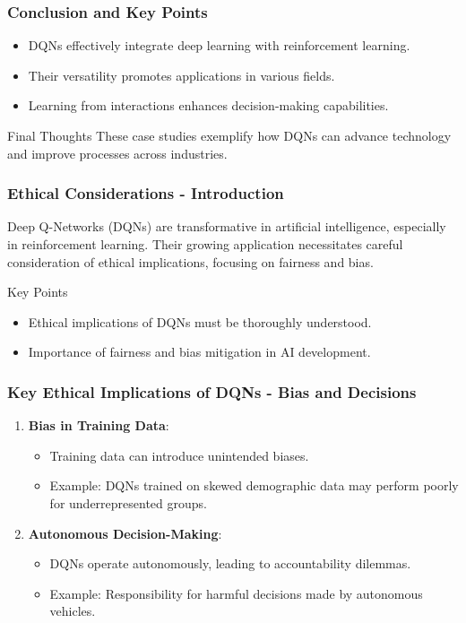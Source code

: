 \documentclass{beamer}
\begin{document}
\begin{frame}
    \frametitle{Conclusion and Key Points}
    \begin{itemize}
        \item DQNs effectively integrate deep learning with reinforcement learning.
        \item Their versatility promotes applications in various fields.
        \item Learning from interactions enhances decision-making capabilities.
    \end{itemize}
    \begin{block}{Final Thoughts}
        These case studies exemplify how DQNs can advance technology and improve processes across industries.
    \end{block}
\end{frame}

\begin{frame}[fragile]
    \frametitle{Ethical Considerations - Introduction}
    Deep Q-Networks (DQNs) are transformative in artificial intelligence, especially in reinforcement learning. Their growing application necessitates careful consideration of ethical implications, focusing on fairness and bias.
    \begin{block}{Key Points}
        \begin{itemize}
            \item Ethical implications of DQNs must be thoroughly understood.
            \item Importance of fairness and bias mitigation in AI development.
        \end{itemize}
    \end{block}
\end{frame}

\begin{frame}[fragile]
    \frametitle{Key Ethical Implications of DQNs - Bias and Decisions}
    \begin{enumerate}
        \item \textbf{Bias in Training Data}:
            \begin{itemize}
                \item Training data can introduce unintended biases.
                \item Example: DQNs trained on skewed demographic data may perform poorly for underrepresented groups.
            \end{itemize}
        \item \textbf{Autonomous Decision-Making}:
            \begin{itemize}
                \item DQNs operate autonomously, leading to accountability dilemmas.
                \item Example: Responsibility for harmful decisions made by autonomous vehicles.
            \end{itemize}
    \end{enumerate}
\end{frame}
\end{document}
